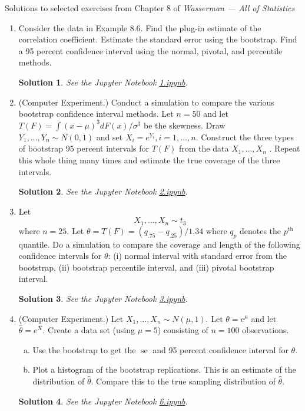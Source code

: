\documentclass[10pt]{article}
\newtheorem*{sol}{Solution}
\newcommand{\se}{\operatorname{se}}
\begin{document}
\noindent \large{Solutions to selected exercises from Chapter 8 of
\emph{Wasserman --- All of Statistics}}

\begin{enumerate}
\item[(1)] Consider the data in Example 8.6. Find the plug-in estimate of the
correlation coefficient. Estimate the standard error using the bootstrap.
Find a 95 percent confidence interval using the normal, pivotal, and
percentile methods.

\begin{sol}
See the Jupyter Notebook
\href{https://github.com/ajrasmus/some_of_statistics/blob/main/chapter_8/1.ipynb}{1.ipynb}.
\end{sol}

\item[(2)] (Computer Experiment.) Conduct a simulation to compare the various
bootstrap confidence interval methods. Let $n = 50$ and let
$T(F)=\int (x-\mu)^3 dF(x)/\sigma^3$ be the skewness. Draw $Y_1,\ldots,Y_n \sim N(0,1)$
and set $X_i=e^{Y_i}, i=1,\ldots,n$. Construct the three types of bootstrap 95
percent intervals for $T(F)$ from the data $X_1,\ldots,X_n$ . Repeat this whole
thing many times and estimate the true coverage of the three intervals.

\begin{sol}
See the Jupyter Notebook
\href{https://github.com/ajrasmus/some_of_statistics/blob/main/chapter_8/2.ipynb}{2.ipynb}.
\end{sol}

\item[(3)] Let
\[
X_1,\ldots,X_n \sim t_3
\]
where $n = 25$. Let $\theta = T(F) = (q_{.75} - q_{.25})/1.34$ where $q_p$ denotes the
$p^{\text{th}}$ quantile. Do a simulation to compare the coverage and length of the
following confidence intervals for $\theta$: (i) normal interval with standard
error from the bootstrap, (ii) bootstrap percentile interval, and (iii)
pivotal bootstrap interval.

\begin{sol}
See the Jupyter Notebook
\href{https://github.com/ajrasmus/some_of_statistics/blob/main/chapter_8/3.ipynb}{3.ipynb}.
\end{sol}

\item[(6)] (Computer Experiment.) Let $X_1,\ldots,X_n\sim N(\mu,1)$.
Let $\theta=e^\mu$ and let $\hat\theta = e^{\overline X}$.
Create a data set (using $\mu=5$) consisting of $n=100$ observations.
\begin{enumerate}[(a)]
\item Use the bootstrap to get the $\se$ and 95 percent confidence interval
for $\theta$.
\item Plot a histogram of the bootstrap replications. This is an estimate
of the distribution of $\hat\theta$. Compare this to the true sampling distribution
of $\hat\theta$.
\end{enumerate}

\begin{sol}
See the Jupyter Notebook
\href{https://github.com/ajrasmus/some_of_statistics/blob/main/chapter_8/6.ipynb}{6.ipynb}.
\end{sol}

\end{enumerate}
\end{document}
